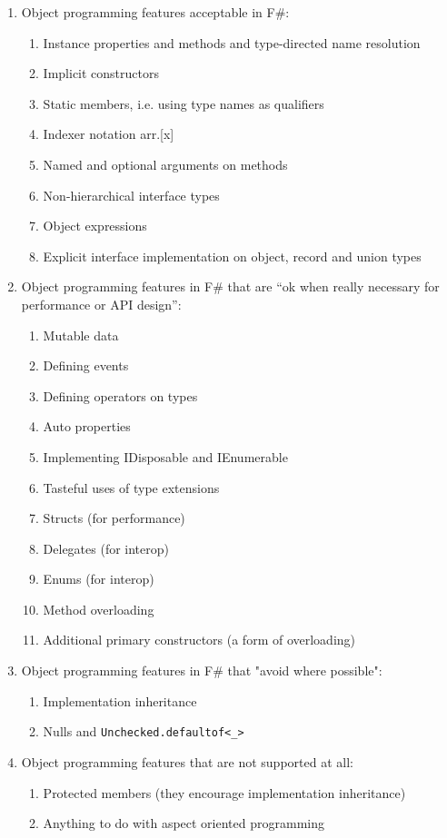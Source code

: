 \documentclass[acmsmall,review]{acmart}\settopmatter{printfolios=true,printccs=false,printacmref=false}
\begin{document}
\begin{enumerate}
\it
\item Object programming features acceptable in F\#:
\begin{enumerate}
\item Instance properties and methods and type-directed name resolution
\item Implicit constructors 
\item Static members, i.e. using type names as qualifiers
\item Indexer notation arr.[x]  
\item Named and optional arguments on methods
\item Non-hierarchical interface types
\item Object expressions 
\item Explicit interface implementation on object, record and union types
\end{enumerate}

\item Object programming features in F\# that are “ok when really necessary for performance or API design”: 
\begin{enumerate}
\item Mutable data
\item Defining events
\item Defining operators on types
\item Auto properties
\item Implementing IDisposable and IEnumerable
\item Tasteful uses of type extensions
\item Structs (for performance)
\item Delegates (for interop)
\item Enums (for interop)
\item Method overloading
\item Additional primary constructors (a form of overloading)
\end{enumerate}

\item Object programming features in F\# that "avoid where possible":

\begin{enumerate}
\item Implementation inheritance
\item Nulls and \texttt{Unchecked.defaultof<\_>}
\end{enumerate}

\item Object programming features that are not supported at all:

\begin{enumerate}
\item Protected members (they encourage implementation inheritance)
\item Anything to do with aspect oriented programming
\end{enumerate}
\end{enumerate}
\end{document}
